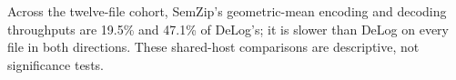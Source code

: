 Across the twelve-file cohort, SemZip's geometric-mean encoding and decoding throughputs are 19.5\% and 47.1\% of DeLog's; it is slower than DeLog on every file in both directions. These shared-host comparisons are descriptive, not significance tests.
